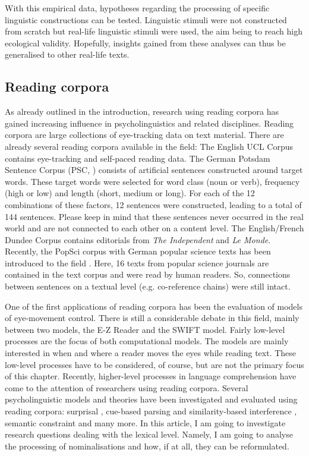 \documentclass[output=paper]{langsci/langscibook}
\begin{document}
With this empirical data, hypotheses regarding the processing of specific linguistic constructions can be tested. Linguistic stimuli were not constructed from scratch but real-life linguistic stimuli were used, the aim being to reach high ecological validity. Hopefully, insights gained from these analyses can thus be generalised to other real-life texts. 

\subsection{\label{bkm:Ref283725832}Reading corpora}

As already outlined in the introduction, research using reading corpora has gained increasing influence in psycholinguistics and related disciplines. Reading corpora are large collections of eye-tracking data on text material. There are already several reading corpora available in the field: The English UCL Corpus \citep{Frank2013} contains eye-tracking and self-paced reading data. The German Potsdam Sentence Corpus (PSC, \citealt{Kliegl2006}) consists of artificial sentences constructed around target words. These target words were selected for word class (noun or verb), frequency (high or low) and length (short, medium or long). For each of the 12 combinations of these factors, 12 sentences were constructed, leading to a total of 144 sentences. Please keep in mind that these sentences never occurred in the real world and are not connected to each other on a content level. The English/French Dundee Corpus \citep{Kennedy2003} contains editorials from \textit{The Independent }and \textit{Le Monde}. Recently, the PopSci corpus with German popular science texts has been introduced to the field \citep{MuellerFeldmeth2013}. Here, 16 texts from popular science journals are contained in the text corpus and were read by human readers. So, connections between sentences on a textual level (e.g. co-reference chains) were still intact.

One of the first applications of reading corpora has been the evaluation of models of eye-movement control. There is still a considerable debate in this field, mainly between two models, the E-Z Reader \citep{Reichle2003} and the SWIFT \citep{Engbert2005} model. Fairly low-level processes are the focus of both computational models. The models are mainly interested in when and where a reader moves the eyes while reading text. These low-level processes have to be considered, of course, but are not the primary focus of this chapter. Recently, higher-level processes in language comprehension have come to the attention of researchers using reading corpora. Several psycholinguistic models and theories have been investigated and evaluated using reading corpora: surprisal \citep{Demberg2008, Patil2009}, cue-based parsing and similarity-based interference \citep{MuellerFeldmeth2013}, semantic constraint \citep{Pynte2008} and many more. In this article, I am going to investigate research questions dealing with the lexical level. Namely, I am going to analyse the processing of nominalisations and how, if at all, they can be reformulated.
\end{document}
